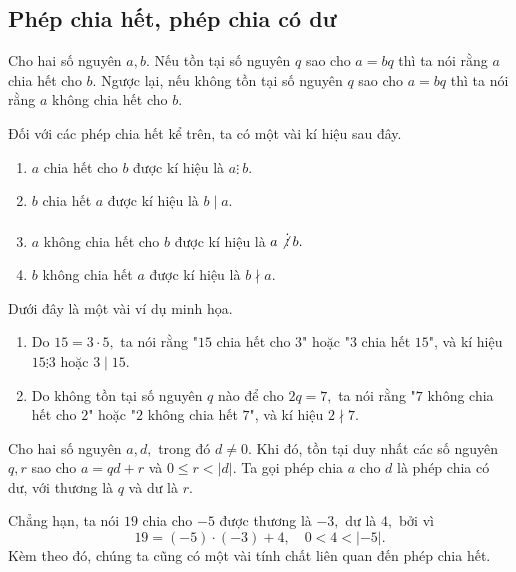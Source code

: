 \subsection{Phép chia hết, phép chia có dư}
\begin{dx}
Cho hai số nguyên $a, b$. Nếu tồn tại số nguyên $q$ sao cho $a=bq$ thì ta nói rằng $a$ chia hết cho $b.$ Ngược lại, nếu không tồn tại số nguyên $q$ sao cho $a=bq$ thì ta nói rằng $a$ không chia hết cho $b.$
\end{dx}
Đối với các phép chia hết kể trên, ta có một vài kí hiệu sau đây.
\begin{enumerate}
    \item $a$ chia hết cho $b$ được kí hiệu là $a\vdots\: b.$
    \item $b$ chia hết $a$ được kí hiệu là $b\mid a.$
    \item $a$ không chia hết cho $b$ được kí hiệu là $a\not\vdots\: b.$
    \item $b$ không chia hết $a$ được kí hiệu là $b\nmid a.$     
\end{enumerate}
Dưới đây là một vài ví dụ minh họa.
\begin{enumerate}
    \item Do $15=3\cdot 5,$ ta nói rằng "$15$ chia hết cho $3$" hoặc "$3$ chia hết $15$", và kí hiệu $15\vdots 3$ hoặc $3 \mid 15.$
    \item Do không tồn tại số nguyên $q$ nào để cho $2q=7,$ ta nói rằng "$7$ không chia hết cho $2$" hoặc "$2$ không chia hết $7$", và kí hiệu $2\nmid 7.$
\end{enumerate}

\begin{dx}
Cho hai số nguyên $a,d,$ trong đó $d\ne 0.$ Khi đó, tồn tại duy nhất các số nguyên $q,r$ sao cho $a=qd+r$ và $0\le r<|d|.$ Ta gọi phép chia $a$ cho $d$ là phép chia có dư, với thương là $q$ và dư là $r.$
\end{dx}

Chẳng hạn, ta nói $19$ chia cho $-5$ được thương là $-3,$ dư là $4,$ bởi vì 
$$19=(-5)\cdot(-3)+4,\quad 0<4<|-5|.$$
Kèm theo đó, chúng ta cũng có một vài tính chất liên quan đến phép chia hết.

